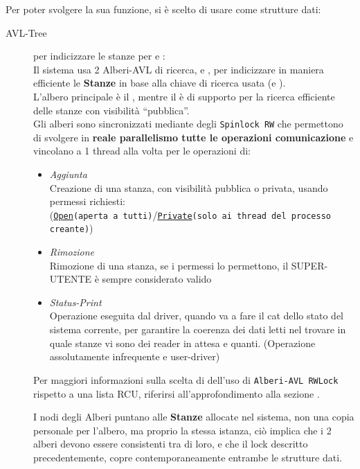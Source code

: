 Per poter svolgere la sua funzione, si è scelto di usare come strutture dati:
\begin{description}
\item[AVL-Tree] per indicizzare le stanze per \tagSys e \keySys:\\
    Il sistema usa 2 Alberi-AVL di ricerca, \tagTree e \keyTree, per indicizzare in maniera efficiente le
    \textbf{Stanze} in base alla chiave di ricerca usata (\tagSys e \keySys). \\
    L'albero principale è il \tagTree, mentre il \keyTree è di supporto per la ricerca efficiente delle
    stanze con visibilità ``pubblica''.\\
    Gli alberi sono sincronizzati mediante degli \texttt{Spinlock RW} che permettono di svolgere in \textbf{reale
    parallelismo tutte le operazioni comunicazione} e vincolano a 1 thread alla volta per le operazioni di:
    \begin{itemize}
    \item \textit{Aggiunta} \\
        Creazione di una stanza, con visibilità pubblica o privata, usando permessi richiesti:\\
        (\texttt{\underline{Open}(aperta a tutti)}/\texttt{\underline{Private}(solo ai thread del processo creante)})
    \item \textit{Rimozione} \\
        Rimozione di una stanza, se i permessi lo permettono, il SUPER-UTENTE è sempre considerato valido
    \item \textit{Status-Print} \\
        Operazione eseguita dal driver, quando va a fare il cat dello stato del sistema corrente, per garantire la
        coerenza dei dati letti nel trovare in quale stanze vi sono dei reader in attesa e quanti. (Operazione
        assolutamente infrequente e user-driver)
\end{itemize}

\begin{footnotesize}
Per maggiori informazioni sulla scelta di dell'uso di \texttt{Alberi-AVL RWLock} rispetto a una lista
RCU, riferirsi all'approfondimento alla sezione .
\end{footnotesize}

I nodi degli Alberi puntano alle \textbf{Stanze} allocate nel sistema, non una copia personale per l'albero, ma
proprio la stessa istanza, ciò implica che i 2 alberi devono essere consistenti tra di loro, e che il lock
descritto precedentemente, copre contemporaneamente entrambe le strutture dati.


\end{description}

